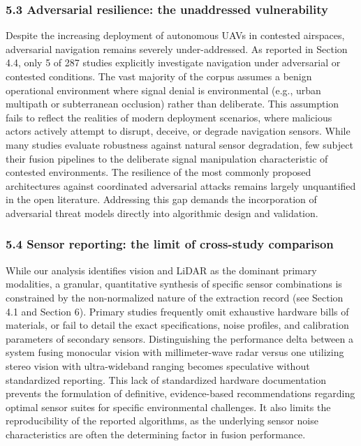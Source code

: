 \documentclass[conference]{IEEEtran}
\begin{document}
\subsubsection{5.3 Adversarial resilience: the unaddressed vulnerability}


Despite the increasing deployment of autonomous UAVs in contested airspaces, adversarial navigation remains severely under-addressed. As reported in Section 4.4, only 5 of 287 studies explicitly investigate navigation under adversarial or contested conditions. The vast majority of the corpus assumes a benign operational environment where signal denial is environmental (e.g., urban multipath or subterranean occlusion) rather than deliberate. This assumption fails to reflect the realities of modern deployment scenarios, where malicious actors actively attempt to disrupt, deceive, or degrade navigation sensors. While many studies evaluate robustness against natural sensor degradation, few subject their fusion pipelines to the deliberate signal manipulation characteristic of contested environments. The resilience of the most commonly proposed architectures against coordinated adversarial attacks remains largely unquantified in the open literature. Addressing this gap demands the incorporation of adversarial threat models directly into algorithmic design and validation.


\subsubsection{5.4 Sensor reporting: the limit of cross-study comparison}


While our analysis identifies vision and LiDAR as the dominant primary modalities, a granular, quantitative synthesis of specific sensor combinations is constrained by the non-normalized nature of the extraction record (see Section 4.1 and Section 6). Primary studies frequently omit exhaustive hardware bills of materials, or fail to detail the exact specifications, noise profiles, and calibration parameters of secondary sensors. Distinguishing the performance delta between a system fusing monocular vision with millimeter-wave radar versus one utilizing stereo vision with ultra-wideband ranging becomes speculative without standardized reporting. This lack of standardized hardware documentation prevents the formulation of definitive, evidence-based recommendations regarding optimal sensor suites for specific environmental challenges. It also limits the reproducibility of the reported algorithms, as the underlying sensor noise characteristics are often the determining factor in fusion performance.
\end{document}
